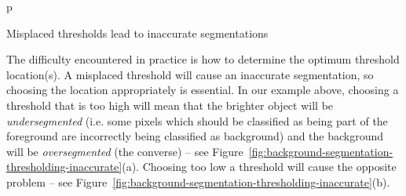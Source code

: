 \begin{stusubfig}{p}
	\hspace{4mm}%
\caption{Misplaced thresholds lead to inaccurate segmentations}
\label{fig:background-segmentation-thresholding-inaccurate}
\end{stusubfig}

\afterpage{\clearpage}

The difficulty encountered in practice is how to determine the optimum threshold location(s). A misplaced threshold will cause an inaccurate segmentation, so choosing the location appropriately is essential. In our example above, choosing a threshold that is too high will mean that the brighter object will be \emph{undersegmented} (i.e. some pixels which should be classified as being part of the foreground are incorrectly being classified as background) and the background will be \emph{oversegmented} (the converse) -- see Figure~\ref{fig:background-segmentation-thresholding-inaccurate}(a). Choosing too low a threshold will cause the opposite problem -- see Figure~\ref{fig:background-segmentation-thresholding-inaccurate}(b).


